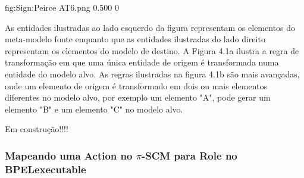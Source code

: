        {fig:Sign:Peirce}
       {AT6.png}
       {0.500}
       {0}

As entidades ilustradas ao lado esquerdo da figura representam os elementos do meta-modelo fonte enquanto que as entidades ilustradas do lado direito representam os elementos do modelo de destino. A Figura 4.1a ilustra a regra de transformação em que uma única entidade de origem é transformada numa entidade do modelo alvo. As regras ilustradas na figura 4.1b são mais avançadas, onde  um elemento de origem é transformado em dois ou mais elementos diferentes no modelo alvo, por exemplo um elemento  "A", pode  gerar um elemento "B" e um elemento "C" no modelo alvo.





Em construção!!!!

%
\subsubsection{Mapeando uma Action no $\pi$-SCM para Role no BPELexecutable}


